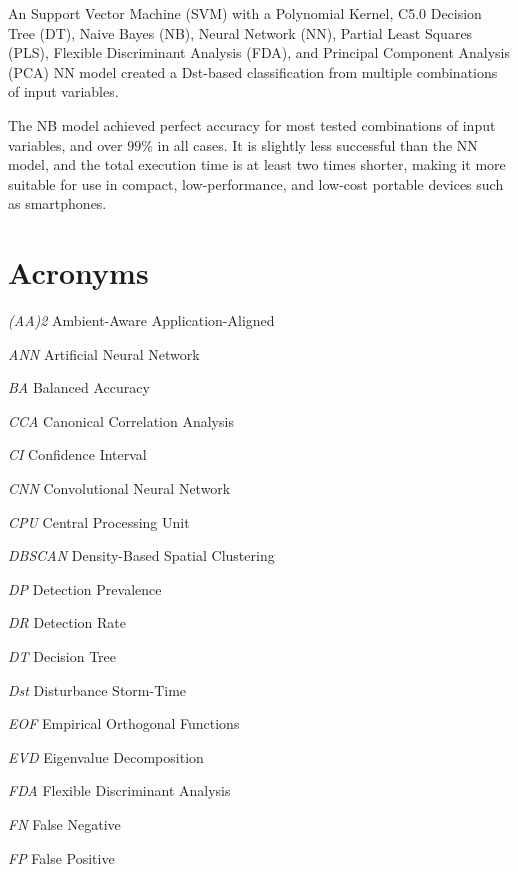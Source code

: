 \documentclass[sn-mathphys-num]{sn-jnl}%
\begin{document}
An Support Vector Machine (SVM) with a Polynomial Kernel, C5.0 Decision Tree (DT), Naive Bayes (NB), Neural Network (NN), Partial Least Squares (PLS), Flexible Discriminant Analysis (FDA), and Principal Component Analysis (PCA) NN model created a Dst-based classification from multiple combinations of input variables.

The NB model achieved perfect accuracy for most tested combinations of input variables, and over $99\%$ in all cases. It is slightly less successful than the NN model, and the total execution time is at least two times shorter, making it more suitable for use in compact, low-performance, and low-cost portable devices such as smartphones.

\clearpage

\section{Acronyms}
\label{sec:Acronyms}

\textit{(AA)2} Ambient-Aware Application-Aligned



\textit{ANN} Artificial Neural Network



\textit{BA} Balanced Accuracy



\textit{CCA} Canonical Correlation Analysis

\textit{CI} Confidence Interval

\textit{CNN} Convolutional Neural Network

\textit{CPU} Central Processing Unit



\textit{DBSCAN} Density-Based Spatial Clustering

\textit{DP} Detection Prevalence

\textit{DR} Detection Rate

\textit{DT} Decision Tree

\textit{Dst} Disturbance Storm-Time



\textit{EOF} Empirical Orthogonal Functions

\textit{EVD} Eigenvalue Decomposition



\textit{FDA} Flexible Discriminant Analysis

\textit{FN} False Negative

\textit{FP} False Positive
\end{document}
